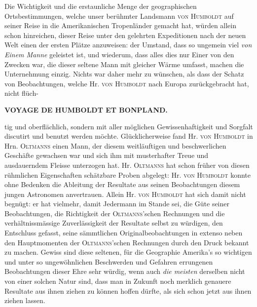 Die Wichtigkeit und die erstaunliche Menge der geographischen Ortsbestimmungen, welche unser berühmter Landsmann \textsc{von Humboldt} auf seiner Reise in die Amerikanischen Tropenländer gemacht hat, würden allein schon hinreichen, dieser Reise unter den gelehrten Expeditionen nach der neuen Welt einen der ersten Plätze anzuweisen: der Umstand, dass so ungemein viel \emph{von Einem Manne} geleistet ist, und wiederum, dass alles dies nur Einer von den Zwecken war, die dieser seltene Mann mit gleicher Wärme umfasst, machen die Unternehmung einzig. Nichts war daher mehr zu wünschen, als dass der Schatz von Beobachtungen, welche Hr. \textsc{von Humboldt} nach Europa zurückgebracht hat, nicht flüch-\par
\clearpage
\thispagestyle{empty}
\noindent{}%
\makebox[12mm][l]{}%
\parbox[t]{\dimexpr\linewidth-24mm\relax}{\centering\footnotesize\bfseries VOYAGE DE HUMBOLDT ET BONPLAND.\par}%
\par\nobreak\medskip
\noindent tig und oberflächlich, sondern mit aller möglichen Gewissenhaftigkeit und Sorgfalt discutirt und benutzt werden möchte. Glücklicherweise fand Hr. \textsc{von Humboldt} in Hrn. \textsc{Oltmanns} einen Mann, der diesem weitläuftigen und beschwerlichen Geschäfte gewachsen war und sich ihm mit musterhafter Treue und ausdauerndem Fleisse unterzogen hat. Hr. \textsc{Oltmanns} hat schon früher von diesen rühmlichen Eigenschaften schätzbare Proben abgelegt: Hr. \textsc{von Humboldt} konnte ohne Bedenken die Ableitung der Resultate aus seinen Beobachtungen diesem jungen Astronomen anvertrauen. Allein Hr. \textsc{von Humboldt} hat sich damit nicht begnügt: er hat vielmehr, damit Jedermann im Stande sei, die Güte seiner Beobachtungen, die Richtigkeit der \textsc{Oltmanns}'schen Rechnungen und die verhältnissmässige Zuverlässigkeit der Resultate selbst zu würdigen, den Entschluss gefasst, seine sämmtlichen Originalbeobachtungen in extenso neben den Hauptmomenten der \textsc{Oltmanns}'schen Rechnungen durch den Druck bekannt zu machen. Gewiss sind diese seltenen, für die Geographie Amerika's so wichtigen und unter so ungewöhnlichen Beschwerden und Gefahren errungenen Beobachtungen dieser Ehre sehr würdig, wenn auch \emph{die meisten} derselben nicht von einer solchen Natur sind, dass man in Zukunft noch merklich genauere Resultate aus ihnen ziehen zu können hoffen dürfte, als sich schon jetzt aus ihnen ziehen lassen.

